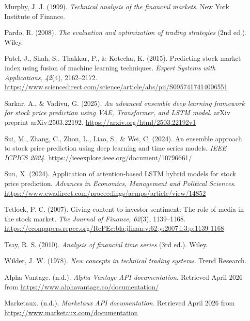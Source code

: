 \documentclass[12pt,a4paper]{report}
\numberwithin{equation}{chapter}
\begin{document}
\begin{list}{}{
  \setlength{\leftmargin}{0.5in}
  \setlength{\itemindent}{-0.5in}
  \setlength{\itemsep}{4pt}
  \setlength{\parsep}{0pt}
  \setlength{\topsep}{2pt}
}
\item Murphy, J. J. (1999). \textit{Technical analysis of the financial markets}. New York Institute of Finance.

\item Pardo, R. (2008). \textit{The evaluation and optimization of trading strategies} (2nd ed.). Wiley.

\item Patel, J., Shah, S., Thakkar, P., \& Kotecha, K. (2015). Predicting stock market index using fusion of machine learning techniques. \textit{Expert Systems with Applications, 42}(4), 2162--2172. \url{https://www.sciencedirect.com/science/article/abs/pii/S0957417414006551}

\item Sarkar, A., \& Vadivu, G. (2025). \textit{An advanced ensemble deep learning framework for stock price prediction using VAE, Transformer, and LSTM model}. arXiv preprint arXiv:2503.22192. \url{https://arxiv.org/html/2503.22192v1}

\item Sui, M., Zhang, C., Zhou, L., Liao, S., \& Wei, C. (2024). An ensemble approach to stock price prediction using deep learning and time series models. \textit{IEEE ICPICS 2024}. \url{https://ieeexplore.ieee.org/document/10796661/}

\item Sun, X. (2024). Application of attention-based LSTM hybrid models for stock price prediction. \textit{Advances in Economics, Management and Political Sciences}. \url{https://www.ewadirect.com/proceedings/aemps/article/view/14852}

\item Tetlock, P. C. (2007). Giving content to investor sentiment: The role of media in the stock market. \textit{The Journal of Finance, 62}(3), 1139--1168. \url{https://econpapers.repec.org/RePEc:bla:jfinan:v:62:y:2007:i:3:p:1139-1168}

\item Tsay, R. S. (2010). \textit{Analysis of financial time series} (3rd ed.). Wiley.

\item Wilder, J. W. (1978). \textit{New concepts in technical trading systems}. Trend Research.

\item Alpha Vantage. (n.d.). \textit{Alpha Vantage API documentation}. Retrieved April 2026 from \url{https://www.alphavantage.co/documentation/}

\item Marketaux. (n.d.). \textit{Marketaux API documentation}. Retrieved April 2026 from \url{https://www.marketaux.com/documentation}


\end{list}
\end{document}
